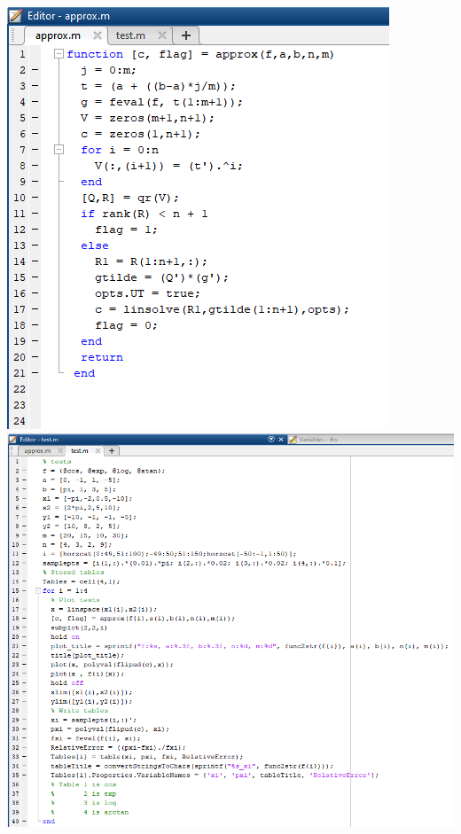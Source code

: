 \documentclass{article}
\begin{document}
\begin{enumerate}
  \includegraphics[width=\textwidth]{approx}
  \includegraphics[width=\textwidth]{test}

\end{enumerate}
\end{document}
